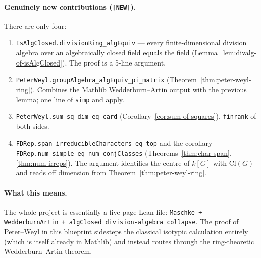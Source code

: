 \paragraph{Genuinely new contributions (\texttt{[NEW]}).}
There are only four:
\begin{enumerate}
  \item \texttt{IsAlgClosed.divisionRing\_algEquiv} — every finite-dimensional
    division algebra over an algebraically closed field equals the field
    (Lemma~\ref{lem:divalg-of-isAlgClosed}). The proof is a 5-line argument.
  \item \texttt{PeterWeyl.groupAlgebra\_algEquiv\_pi\_matrix}
    (Theorem~\ref{thm:peter-weyl-ring}). Combines the Mathlib
    Wedderburn–Artin output with the previous lemma; one line of \texttt{simp}
    and apply.
  \item \texttt{PeterWeyl.sum\_sq\_dim\_eq\_card}
    (Corollary~\ref{cor:sum-of-squares}). \texttt{finrank} of both sides.
  \item \texttt{FDRep.span\_irreducibleCharacters\_eq\_top} and the corollary
    \texttt{FDRep.num\_simple\_eq\_num\_conjClasses}
    (Theorems~\ref{thm:char-span}, \ref{thm:num-irreps}). The argument
    identifies the centre of $k[G]$ with $\mathrm{Cl}(G)$ and reads off
    dimension from Theorem~\ref{thm:peter-weyl-ring}.
\end{enumerate}

\paragraph{What this means.}
The whole project is essentially a five-page Lean file:
\texttt{Maschke + WedderburnArtin + algClosed division-algebra collapse}.
The proof of Peter–Weyl in this blueprint sidesteps the classical isotypic
calculation entirely (which is itself already in Mathlib) and instead routes
through the ring-theoretic Wedderburn–Artin theorem.
